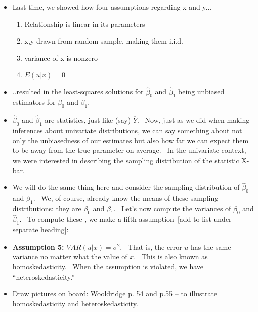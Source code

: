 \documentclass[11pt]{article}
\begin{document}
\begin{itemize}
\item Last time, we showed how four assumptions regarding x and y...

\begin{enumerate}
\item Relationship is linear in its parameters

\item x,y drawn from random sample, making them i.i.d.

\item variance of x is nonzero

\item $E(u|x)=0$
\end{enumerate}

\item ..resulted in the least-squares solutions for $\widehat{\beta }_{0}$
and $\widehat{\beta }_{1}$ being unbiased estimators for $\beta _{0}$ and $%
\beta _{1}.$

\item $\widehat{\beta }_{0}$ and $\widehat{\beta }_{1}$ are statistics, just
like (say) $\overline{Y}$. \ Now, just as we did when making inferences
about univariate distributions, we can say something about not only the
unbiasedness of our estimates but also how far we can expect them to be away
from the true parameter on average. \ In the univariate context, we were
interested in describing the sampling distribution of the statistic X-bar.

\item We will do the same thing here and consider the sampling distribution
of $\widehat{\beta }_{0}$ and $\widehat{\beta }_{1}.$ \ We, of course,
already know the means of these sampling distributions: they are $\beta _{0}$
and $\beta _{1}.$ \ Let's now compute the variances of $\widehat{\beta }_{0}$
and $\widehat{\beta }_{1}.$ \ To compute these , we make a fifth assumption\
[add to list under separate heading]:

\item \textbf{Assumption 5: }$VAR(u|x)=\sigma ^{2}.$ \ That is, the error $u$
has the same variance no matter what the value of $x$. \ This is also known
as homoskedasticity. \ When the assumption is violated, we have
\textquotedblleft heteroskedasticity.\textquotedblright

\item Draw pictures on board: Wooldridge p. 54 and p.55 -- to illustrate
homoskedasticity and heteroskedasticity.


\end{itemize}
\end{document}
